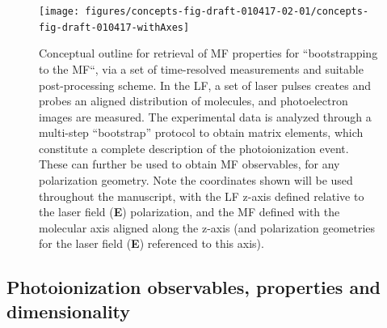\documentclass[10pt]{article}
\begin{document}
\begin{figure}[H]
\begin{center}
\texttt{[image: figures/concepts-fig-draft-010417-02-01/concepts-fig-draft-010417-withAxes]}
\caption{{Conceptual outline for retrieval of MF properties for ``bootstrapping to
the MF``, via a set of time-resolved measurements and suitable
post-processing scheme. In the LF, a set of laser pulses creates and
probes an aligned distribution of molecules, and photoelectron images
are measured. The experimental data is analyzed through a multi-step
``bootstrap'' protocol to obtain matrix elements, which constitute a
complete description of the photoionization event. These can further be
used to obtain MF observables, for any polarization geometry. Note the
coordinates shown will be used throughout the manuscript, with the LF
z-axis defined relative to the laser field (\textbf{E}) polarization,
and the MF defined with the molecular axis aligned along the z-axis (and
polarization geometries for the laser field (\textbf{E}) referenced to
this axis).~
{\label{781808}}%
}}
\end{center}
\end{figure}




\subsection{Photoionization observables, properties and dimensionality\label{sec:Photo-into}}
\end{document}
